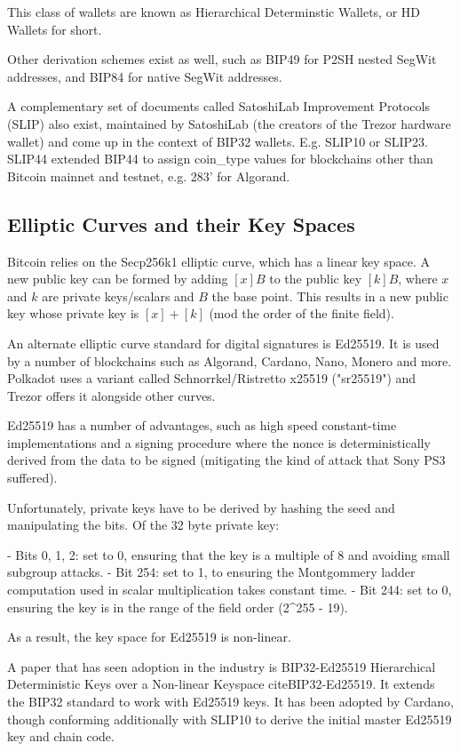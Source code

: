 \documentclass[12pt, a4paper, twocolumn]{article}
\begin{document}
This class of wallets are known as Hierarchical Determinstic Wallets, or HD Wallets for short.

Other derivation schemes exist as well, such as BIP49 for P2SH nested SegWit addresses, and BIP84 for native SegWit addresses.

A complementary set of documents called SatoshiLab Improvement Protocols (SLIP) also exist, maintained by SatoshiLab (the creators of the Trezor hardware wallet) and come up in the context of BIP32 wallets. E.g. SLIP10 or SLIP23. SLIP44 extended BIP44 to assign coin_type values for blockchains other than Bitcoin mainnet and testnet, e.g. 283' for Algorand.

\subsection{Elliptic Curves and their Key Spaces}

Bitcoin relies on the Secp256k1 elliptic curve, which has a linear key space. A new public key can be formed by adding $[x]B$ to the public key $[k]B$, where $x$ and $k$ are private keys/scalars and $B$ the base point. This results in a new public key whose private key is $[x] + [k]$ (mod the order of the finite field).

An alternate elliptic curve standard for digital signatures is Ed25519. It is used by a number of blockchains such as Algorand, Cardano, Nano, Monero and more. Polkadot uses a variant called Schnorrkel/Ristretto x25519 ("sr25519") and Trezor offers it alongside other curves.

Ed25519 has a number of advantages, such as high speed constant-time implementations and a signing procedure where the nonce is deterministically derived from the data to be signed (mitigating the kind of attack that Sony PS3 suffered).

Unfortunately, private keys have to be derived by hashing the seed and manipulating the bits. Of the 32 byte private key:

- Bits 0, 1, 2:  set to 0, ensuring that the key is a multiple of 8 and avoiding small subgroup attacks.
- Bit 254: set to 1, to ensuring the Montgommery ladder computation used in scalar multiplication takes constant time.
- Bit 244: set to 0, ensuring the key is in the range of the field order (2^255 - 19).

As a result, the key space for Ed25519 is non-linear.

A paper that has seen adoption in the industry is BIP32-Ed25519
Hierarchical Deterministic Keys over a Non-linear Keyspace cite{BIP32-Ed25519}. It extends the BIP32 standard to work with Ed25519 keys. It has been adopted by Cardano, though conforming additionally with SLIP10 to derive the initial master Ed25519 key and chain code.
\end{document}
